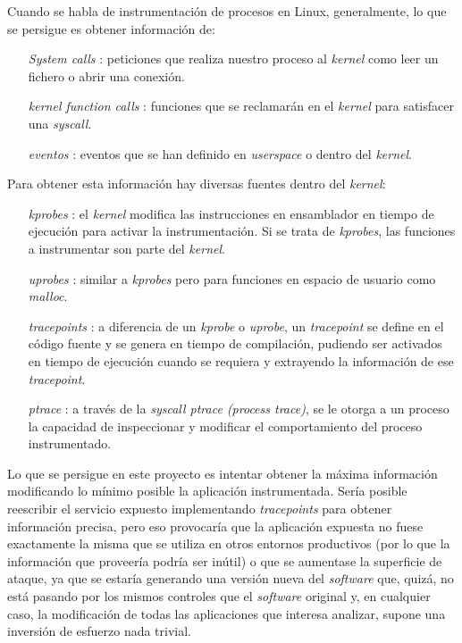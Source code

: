 Cuando se habla de instrumentación de procesos en Linux, generalmente, lo que se persigue es obtener información de:
\begin{enumerate}
    \item[\emph{System calls}]: peticiones que realiza nuestro proceso al \emph{kernel} como leer un fichero o abrir una conexión.
    \item[\emph{kernel function calls}]: funciones que se reclamarán en el \emph{kernel} para satisfacer una \emph{syscall}.
    \item[\emph{eventos}]: eventos que se han definido en \emph{userspace} o dentro del \emph{kernel}.
\end{enumerate}

Para obtener esta información hay diversas fuentes dentro del \emph{kernel}:

\begin{enumerate}
    \item[\emph{kprobes}]: el \emph{kernel} modifica las instrucciones en ensamblador en tiempo de ejecución para activar la instrumentación. Si se trata
    de \emph{kprobes}, las funciones a instrumentar son parte del \emph{kernel}. 
    \item[\emph{uprobes}]: similar a \emph{kprobes} pero para funciones en espacio de usuario como \emph{malloc}.
    \item[\emph{tracepoints}]: a diferencia de un \emph{kprobe} o \emph{uprobe}, un \emph{tracepoint} se define en el código fuente y se genera en tiempo de compilación, pudiendo ser activados en tiempo de ejecución cuando se requiera y extrayendo la información de ese \emph{tracepoint}.
    \item[\emph{ptrace}]: a través de la \emph{syscall ptrace (process trace)}, se le otorga a un proceso la capacidad de inspeccionar y modificar el comportamiento del proceso instrumentado. 
\end{enumerate}

Lo que se persigue en este proyecto es intentar obtener la máxima información modificando lo mínimo posible la aplicación instrumentada. Sería posible
reescribir el servicio expuesto implementando \emph{tracepoints} para obtener información precisa, pero eso provocaría que la aplicación expuesta no fuese exactamente la misma que se utiliza
en otros entornos productivos (por lo que la información que proveería podría ser inútil) o que se aumentase la superficie de ataque, ya que se estaría
generando una versión nueva del \emph{software} que, quizá, no está pasando por los mismos controles que el \emph{software} original y, en cualquier caso, la modificación de todas las aplicaciones
que interesa analizar, supone una inversión de esfuerzo nada trivial.

